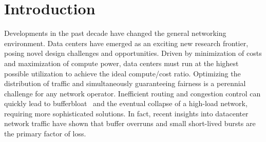 
\section{Introduction}
\label{sec:intro}

%
%

Developments in the past decade have changed the general networking 
environment. Data centers have emerged as an exciting new research frontier, 
posing novel design challenges and opportunities. Driven by minimization of 
costs and maximization of compute power, data centers must run at the highest 
possible utilization to achieve the ideal compute/cost ratio.
Optimizing the distribution of traffic and simultaneously guaranteeing fairness 
is a perennial challenge for any network operator.
Inefficient routing and congestion control can quickly lead to 
bufferbloat~\cite{bufferbloat} and the eventual collapse of a high-load 
network, requiring more sophisticated solutions. In fact, recent insights into 
datacenter network traffic have shown that buffer overruns and small 
short-lived bursts are the primary factor of loss.\cite{fb_dc,msr_dc,dctcp}


